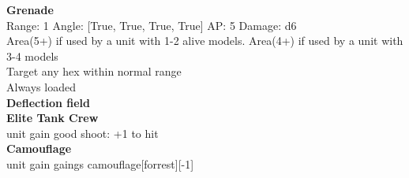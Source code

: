 {\bf Grenade } \\



Range: 1  Angle: [True, True, True, True] AP: 5 Damage: d6 \\
Area(5+) if used by a unit with 1-2 alive models. Area(4+) if used by a unit with 3-4 models\\ 
Target any hex within normal range\\ 
Always loaded\\ 




{\bf Deflection field } \\






{\bf Elite Tank Crew } \\

unit gain good shoot: +1 to hit\\ 





{\bf Camouflage } \\

unit gain gaings camouflage[forrest][-1]\\ 





